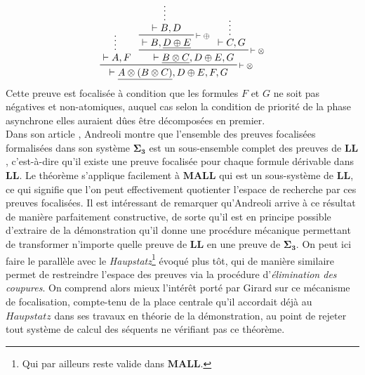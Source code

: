 \documentclass[12pt]{report}
\newcommand{\seq}{\vdash}
\newcommand{\irule}[1]{\footnotesize$#1$}
\newcommand{\iruleR}[1]{\irule{\seq{#1}}}
\begin{document}
\begin{displaymath}
	\prftree[r]{\iruleR{\otimes}}
		{\prfsummary{\seq A,F}}
		{\prftree[r]{\iruleR{\otimes}}
			{\prftree[r]{\iruleR{\oplus}}
				{\prfsummary{\seq B,D}}
				{\seq B,\underline{D \oplus E}}}
			{\prfsummary{\seq C,G}}
			{\seq \underline{B \otimes C},D \oplus E,G}}
	{\seq \underline{A \otimes (B \otimes C)},D \oplus E,F,G}
\end{displaymath}
Cette preuve est focalisée à condition que les formules $F$ et $G$ ne soit pas négatives et non-atomiques, auquel cas selon la condition de priorité de la phase asynchrone elles auraient dûes être décomposées en premier.\\

Dans son article \cite{And92}, Andreoli montre que l'ensemble des preuves focalisées formalisées dans son système $\bm{\Sigma_3}$ est un sous-ensemble complet des preuves de $\mathbf{LL}$, c'est-à-dire qu'il existe une preuve focalisée pour chaque formule dérivable dans $\mathbf{LL}$. Le théorème s'applique facilement à $\mathbf{MALL}$ qui est un sous-système de $\mathbf{LL}$, ce qui signifie que l'on peut effectivement quotienter l'espace de recherche par ces preuves focalisées. Il est intéressant de remarquer qu'Andreoli arrive à ce résultat de manière parfaitement constructive, de sorte qu'il est en principe possible d'extraire de la démonstration qu'il donne une procédure mécanique permettant de transformer n'importe quelle preuve de $\mathbf{LL}$ en une preuve de $\bm{\Sigma_3}$. On peut ici faire le parallèle avec le \textit{Haupstatz}\footnote{Qui par ailleurs reste valide dans $\mathbf{MALL}$.} évoqué plus tôt, qui de manière similaire permet de restreindre l'espace des preuves via la procédure d'\emph{élimination des coupures}. On comprend alors mieux l'intérêt porté par Girard sur ce mécanisme de focalisation, compte-tenu de la place centrale qu'il accordait déjà au $Haupstatz$ dans ses travaux en théorie de la démonstration, au point de rejeter tout système de calcul des séquents ne vérifiant pas ce théorème.\\
\end{document}
